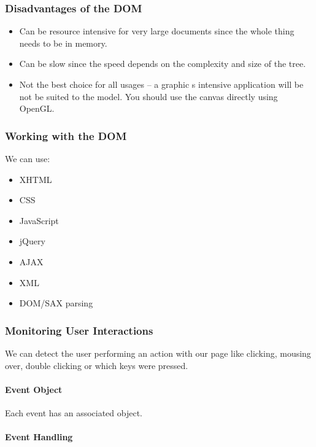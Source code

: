 \subsubsection{Disadvantages of the DOM}\label{ssub:disadvantages_of_the_dom}

\begin{itemize}
    \item Can be resource intensive for very large documents since the whole thing needs to be in memory.
    \item Can be slow since the speed depends on the complexity and size of the tree.
    \item Not the best choice for all usages -- a graphic s intensive application will be not be suited to the model.
          You should use the canvas directly using OpenGL.
\end{itemize}

\subsubsection{Working with the DOM}\label{ssub:working_with_the_dom}

We can use:
\begin{itemize}
    \item XHTML
    \item CSS
    \item JavaScript
    \item jQuery
    \item AJAX
    \item XML
    \item DOM/SAX parsing
\end{itemize}

\subsubsection{Monitoring User Interactions}\label{ssub:monitoring_user_interactions}

We can detect the user performing an action with our page like clicking, mousing over, double clicking or which keys were pressed.

\paragraph{Event Object}\label{par:event_object}

Each event has an associated object.

\paragraph{Event Handling}\label{par:event_handling}

